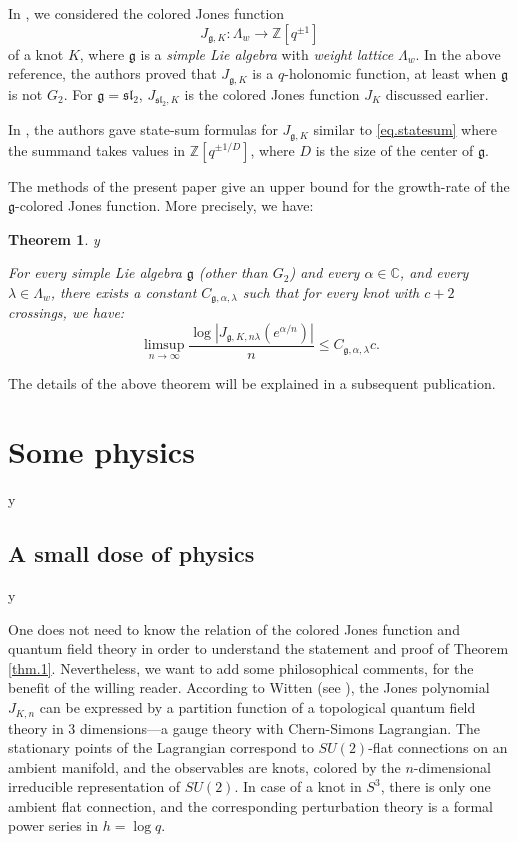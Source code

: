 \documentclass{amsart}
\newtheorem{theorem}{Theorem}[section]
\theoremstyle{definition}
\def\printname#1{
    \if\draft y
        \smash{\makebox[0pt]{\hspace{-0.5in}
            \raisebox{8pt}{\tt\tiny #1}}}
    \fi
}
\def\lbl#1{\label{#1}\printname{#1}}
\def\BZ{\mathbb Z}
\def\BC{\mathbb C}
\def\a{\alpha}
\def\La{\Lambda}
\def\l{\lambda}
\def\longto{\longrightarrow}
\def\fg{\mathfrak{g}}
\begin{document}
In \cite{GL}, we considered the colored Jones function
$$
J_{\fg,K}: \La_w \longto \BZ[q^{\pm 1}]
$$
of a knot $K$, where $\fg$ is a {\em simple Lie algebra} with {\em
weight lattice}
$\La_w$. In the above reference, the authors proved that $J_{\fg,K}$
is a $q$-holonomic function, at least when $\fg$ is not $G_2$.
For $\fg=\mathfrak{sl}_2$, $J_{\mathfrak{sl}_2,K}$ is the colored Jones
function $J_K$ discussed earlier.

In \cite{GL} , the authors gave  state-sum formulas for $J_{\fg,K}$
similar to \eqref{eq.statesum} where the summand takes values in
$\BZ[q^{\pm 1/D}]$, where $D$ is the size of the center of $\fg$.


The methods of the present paper give an upper bound for
the growth-rate of the $\fg$-colored Jones function. More precisely,
we have:

\begin{theorem}
\lbl{thm.gJones}
For every simple Lie algebra $\fg$ (other than $G_2$)  and every
$\a \in \BC$, and every $\l \in \La_w$, there exists a
constant $C_{\fg,\a,\l}$ such that for every knot with $c+2$ crossings,
we have:
$$
\limsup_{n \to \infty} \frac{\log|J_{\fg,K,n\l}(e^{\a/n})|}{n} \leq
C_{\fg,\a,\l} c .
$$
\end{theorem}

The details of the above theorem will be explained in a subsequent
publication.




\section{Some physics}
\lbl{sec.physics}


\subsection{A small dose of physics}
\lbl{sub.physics}

One does not need to know the relation of the colored Jones
function and quantum field theory in order to understand the statement
and proof of Theorem \ref{thm.1}. Nevertheless, we want to add some
philosophical comments, for the benefit of the willing reader.
According to Witten (see \cite{Wi}), the Jones polynomial
$J_{K,n}$ can be expressed by a partition function of a topological quantum
field theory in $3$ dimensions---a gauge theory with Chern-Simons Lagrangian.
The stationary points of the Lagrangian
correspond to $SU(2)$-flat connections on an ambient manifold, and the
observables are knots, colored by the $n$-dimensional irreducible
representation of $SU(2)$. In case of a knot in $S^3$, there is only one
ambient flat connection, and the corresponding perturbation theory
is a formal power series in $h=\log q$.
\end{document}
